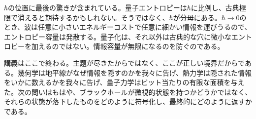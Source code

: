 \(\hbar\)の位置に最後の驚きが含まれている。量子エントロピーは\(\hbar\)に比例し、古典極限で消えると期待するかもしれない。そうではなく、\(\hbar\)が分母にある。\(\hbar\to0\)のとき、波は任意に小さいエネルギーコストで任意に細かい情報を運びうるので、エントロピー容量は発散する。量子化は、それ以外は古典的な穴に微小なエントロピーを加えるのではない。情報容量が無限になるのを防ぐのである。

\begin{classroomqa}
\end{classroomqa}

講義はここで終わる。主題が尽きたからではなく、ここが正しい境界だからである。幾何学は地平線がなぜ情報を隠すのかを我々に告げ、熱力学は隠された情報をいかに数えるかを我々に告げ、量子力学はビット当たりの有限な面積を与えた。次の問いはもはや、ブラックホールが微視的状態を持つかどうかではなく、それらの状態が落下したものをどのように符号化し、最終的にどのように返すかである。